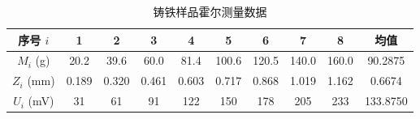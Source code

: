 \documentclass[UTF8]{article}
\theoremstyle{MyLineTheoremStyle} %
\theoremstyle{MyBlockTheoremStyle} %
\theoremstyle{MySubsubsectionStyle} %
\begin{document}
\begin{table}[H]\centering
    \caption{铸铁样品几何尺寸测量数据}
    \label{铸铁样品几何尺寸测量数据}
\end{table}
\begin{table}[H]\centering
    \caption{铸铁样品霍尔测量数据}
    \label{铸铁样品霍尔测量数据}
\begin{tabular}{cccccccccc}\toprule
    序号 $i$ & 1 & 2 & 3 & 4 & 5 & 6 & 7 & 8 & 均值 \\
    \midrule
    $M_i$ (g)   & 20.2 & 39.6 & 60.0 & 81.4 & 100.6 & 120.5 & 140.0 & 160.0 &  90.2875 \\
    $Z_i$  (mm) & 0.189 & 0.320 & 0.461 & 0.603 & 0.717 & 0.868 & 1.019 & 1.162 &  0.6674 \\
    $U_i$  (mV) & 31 & 61 & 91 & 122 & 150 & 178 & 205 & 233 &  133.8750 \\
    \bottomrule
\end{tabular}
\end{table}
\end{document}
